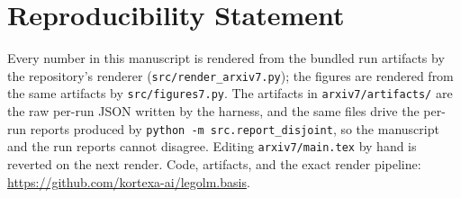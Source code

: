\documentclass[11pt]{article}
\begin{document}
\section*{Reproducibility Statement}
Every number in this manuscript is rendered from the bundled run artifacts by the repository's renderer (\texttt{src/render\_arxiv7.py}); the figures are rendered from the same artifacts by \texttt{src/figures7.py}. The artifacts in \texttt{arxiv7/artifacts/} are the raw per-run JSON written by the harness, and the same files drive the per-run reports produced by \texttt{python -m src.report\_disjoint}, so the manuscript and the run reports cannot disagree. Editing \texttt{arxiv7/main.tex} by hand is reverted on the next render. Code, artifacts, and the exact render pipeline: \url{https://github.com/kortexa-ai/legolm.basis}.



\end{document}
